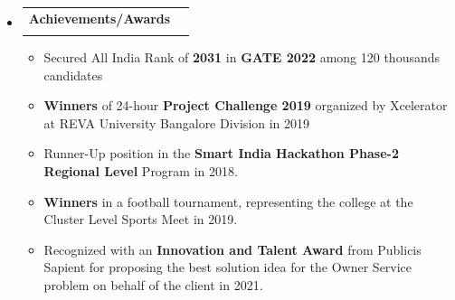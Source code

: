 \documentclass[letterpaper,8pt]{article}
\makeatletter
\newcommand{\resumeItem}[1]{
  \item\small{
    {#1 \vspace{-2pt}}
  }
}
\newcommand{\resumeSubheading}[4]{
  \vspace{-2pt}\item
    \begin{tabular*}{1.0\textwidth}[t]{l@{\extracolsep{\fill}}r}
      \textbf{#1} & \textbf{\small #2} \\
      \textit{\small#3} & \textit{\small #4} \\
    \end{tabular*}\vspace{-7pt}
}
\newcommand{\resumeSubHeadingListStart}{\begin{itemize}[leftmargin=0.0in, label={}]}
\newcommand{\resumeSubHeadingListEnd}{\end{itemize}}
\newcommand{\resumeItemListStart}{\begin{itemize}}
\newcommand{\resumeItemListEnd}{\end{itemize}\vspace{-5pt}}
\makeatother
\begin{document}
            \vspace{-19pt}
        \resumeSubHeadingListStart
        \resumeSubheading{Achievements/Awards }{}{}{}
        \vspace{-17pt}
            \resumeItemListStart
                \resumeItem{Secured All India Rank of \textbf{2031} in \textbf{GATE 2022} among 120 thousands candidates}
                \resumeItem{\textbf{Winners} of 24-hour \textbf{Project Challenge 2019} organized by Xcelerator at REVA University Bangalore Division in 2019}
                \resumeItem{Runner-Up position in the \textbf{Smart India Hackathon Phase-2 Regional Level} Program in 2018.}
                \resumeItem{\textbf{Winners} in a football tournament, representing the college at the Cluster Level Sports Meet in 2019.}
                \resumeItem{Recognized with an \textbf{Innovation and Talent Award} from Publicis Sapient for proposing the best solution idea for the Owner Service problem on behalf of the client in 2021.}
            \resumeItemListEnd
    \resumeSubHeadingListEnd
\end{document}
